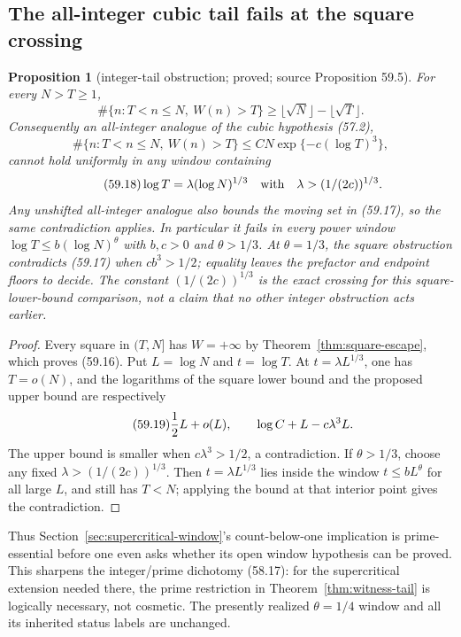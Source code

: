 \documentclass[10pt,reqno]{amsart}
\newtheorem{proposition}[theorem]{Proposition}
\theoremstyle{definition}
\newcommand{\1}{\mathbf 1}
\begin{document}
\subsection{The all-integer cubic tail fails at the square crossing}
\begin{proposition}[integer-tail obstruction; proved; source Proposition
59.5]
\label{prop:integer-tail-obstruction}
For every $N>T\geq1$,
\begin{equation}\tag{59.16}
 \#\{n:T<n\leq N,\ W(n)>T\}
 \geq \lfloor\sqrt N\rfloor-\lfloor\sqrt T\rfloor.
\end{equation}
Consequently an all-integer analogue of the cubic hypothesis (57.2),
\begin{equation}\tag{59.17}
 \#\{n:T<n\leq N,\ W(n)>T\}
       \leq C N\exp\{-c(\log T)^3\},
\end{equation}
cannot hold uniformly in any window containing
\begin{equation}\tag{59.18}
 \log T=\lambda(\log N)^{1/3}
 \quad\hbox{with}\quad \lambda>(1/(2c))^{1/3}.
\end{equation}
Any unshifted all-integer analogue also bounds the moving set in (59.17), so
the same contradiction applies.  In particular it fails in every power
window $\log T\leq b(\log N)^\theta$ with $b,c>0$ and $\theta>1/3$.
At $\theta=1/3$, the square obstruction contradicts (59.17) when
$cb^3>1/2$; equality leaves the prefactor and endpoint floors to decide.
The constant $(1/(2c))^{1/3}$ is the exact crossing for this
square-lower-bound comparison, not a claim that no other integer obstruction
acts earlier.
\end{proposition}
\begin{proof}
Every square in $(T,N]$ has $W=+\infty$ by
Theorem~\ref{thm:square-escape}, which proves (59.16).  Put $L=\log N$ and
$t=\log T$.  At $t=\lambda L^{1/3}$, one has $T=o(N)$, and the logarithms
of the square lower bound and the proposed upper bound are respectively
\begin{equation}\tag{59.19}
             {1\over2}L+o(L),
       \qquad \log C+L-c\lambda^3L.
\end{equation}
The upper bound is smaller when $c\lambda^3>1/2$, a contradiction.  If
$\theta>1/3$, choose any fixed
$\lambda>(1/(2c))^{1/3}$.  Then $t=\lambda L^{1/3}$ lies inside the window
$t\leq bL^\theta$ for all large $L$, and still has $T<N$; applying the
bound at that interior point gives the contradiction.
\end{proof}

Thus Section~\ref{sec:supercritical-window}'s count-below-one implication is
prime-essential before one even asks whether its open window hypothesis can
be proved.  This sharpens the integer/prime dichotomy (58.17): for the
supercritical extension needed there, the prime restriction in
Theorem~\ref{thm:witness-tail} is logically necessary, not cosmetic.  The
presently realized $\theta=1/4$ window and all its inherited status labels
are unchanged.
\end{document}
